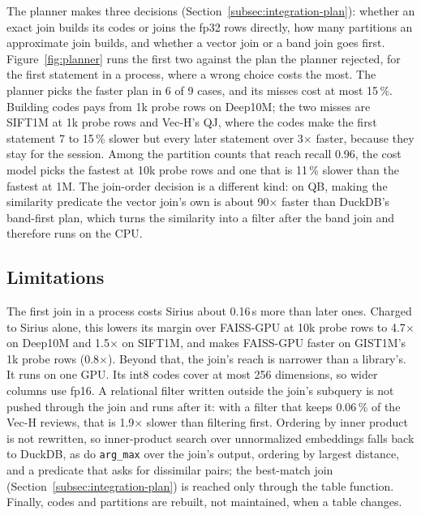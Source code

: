 The planner makes three decisions (Section~\ref{subsec:integration-plan}): whether an exact join builds its codes or joins the fp32 rows directly, how many partitions an approximate join builds, and whether a vector join or a band join goes first.
Figure~\ref{fig:planner} runs the first two against the plan the planner rejected, for the first statement in a process, where a wrong choice costs the most.
The planner picks the faster plan in 6 of 9 cases, and its misses cost at most 15\,\%.
Building codes pays from 1k probe rows on Deep10M; the two misses are SIFT1M at 1k probe rows and Vec-H's QJ, where the codes make the first statement 7 to 15\,\% slower but every later statement over 3$\times$ faster, because they stay for the session.
Among the partition counts that reach recall 0.96, the cost model picks the fastest at 10k probe rows and one that is 11\,\% slower than the fastest at 1M.
The join-order decision is a different kind: on QB, making the similarity predicate the vector join's own is about 90$\times$ faster than DuckDB's band-first plan, which turns the similarity into a filter after the band join and therefore runs on the CPU.

\subsection{Limitations}\label{subsec:eval-limits}

The first join in a process costs Sirius about 0.16\,s more than later ones.
Charged to Sirius alone, this lowers its margin over FAISS-GPU at 10k probe rows to 4.7$\times$ on Deep10M and 1.5$\times$ on SIFT1M, and makes FAISS-GPU faster on GIST1M's 1k probe rows (0.8$\times$).
Beyond that, the join's reach is narrower than a library's.
It runs on one GPU.
Its int8 codes cover at most 256 dimensions, so wider columns use fp16.
A relational filter written outside the join's subquery is not pushed through the join and runs after it: with a filter that keeps 0.06\,\% of the Vec-H reviews, that is 1.9$\times$ slower than filtering first.
Ordering by inner product is not rewritten, so inner-product search over unnormalized embeddings falls back to DuckDB, as do \texttt{arg\_max} over the join's output, ordering by largest distance, and a predicate that asks for dissimilar pairs; the best-match join (Section~\ref{subsec:integration-plan}) is reached only through the table function.
Finally, codes and partitions are rebuilt, not maintained, when a table changes.
